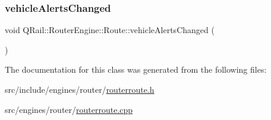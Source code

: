 \mbox{\label{classQRail_1_1RouterEngine_1_1Route_a236daca39e2006e3f0182227079113f6}} 
\subsubsection{\texorpdfstring{vehicleAlertsChanged}{vehicleAlertsChanged}}
{\footnotesize\ttfamily void Q\+Rail\+::\+Router\+Engine\+::\+Route\+::vehicle\+Alerts\+Changed (\begin{DoxyParamCaption}{ }\end{DoxyParamCaption})\hspace{0.3cm}{\ttfamily [signal]}}



The documentation for this class was generated from the following files\+:\begin{DoxyCompactItemize}
\item 
src/include/engines/router/\mbox{\hyperlink{routerroute_8h}{routerroute.\+h}}\item 
src/engines/router/\mbox{\hyperlink{routerroute_8cpp}{routerroute.\+cpp}}\end{DoxyCompactItemize}
